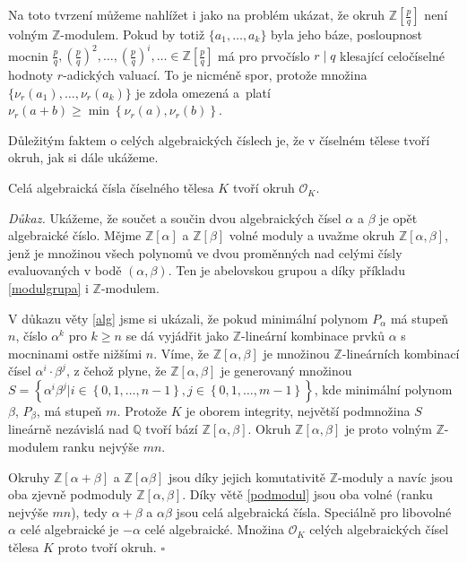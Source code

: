 \documentclass[12pt]{report}
\begin{document}
\begin{poznamka}
Na toto tvrzení můžeme nahlížet i jako na problém ukázat, že okruh $\mathbb{Z}\left[\frac{p}{q}\right]$ není volným $\mathbb{Z}$-modulem. Pokud by totiž $\lbrace a_1,\dots,a_k \rbrace$ byla jeho báze, posloupnost mocnin $\frac{p}{q}, \left(\frac{p}{q}\right)^2, \dots, \left(\frac{p}{q}\right)^i, \dots \in \mathbb{Z}\left[\frac{p}{q}\right]$ má pro prvočíslo $r \mid q$ klesající celočíselné hodnoty $r$-adických valuací. To je nicméně spor, protože množina $\lbrace \nu_r(a_1),\dots,\nu_r(a_k) \rbrace$ je zdola omezená a~platí $\nu_r(a+b) \geqslant \min\left\lbrace\nu_r(a),\nu_r(b)\right\rbrace$.
\end{poznamka}

Důležitým faktem o celých algebraických číslech je, že v číselném tělese tvoří okruh, jak si dále ukážeme.

\begin{veta}
Celá algebraická čísla číselného tělesa $K$ tvoří okruh $\mathcal{O}_K$.
\end{veta}
\noindent \textit{Důkaz.} Ukážeme, že součet a součin dvou algebraických čísel $\alpha$ a $\beta$ je opět algebraické číslo. Mějme $\mathbb{Z}[\alpha]$ a $\mathbb{Z}[\beta]$ volné moduly a uvažme okruh $\mathbb{Z}[\alpha,\beta]$, jenž je množinou všech polynomů ve dvou proměnných nad celými čísly evaluovaných v bodě $(\alpha,\beta)$. Ten je abelovskou grupou a díky příkladu \ref{modulgrupa} i $\mathbb{Z}$-modulem.

V důkazu věty \ref{alg} jsme si ukázali, že pokud minimální polynom $P_\alpha$ má stupeň $n$, číslo $\alpha^k$ pro $k \geqslant n$ se dá vyjádřit jako $\mathbb{Z}$-lineární kombinace prvků $\alpha$ s mocninami ostře nižšími $n$. Víme, že $\mathbb{Z}[\alpha,\beta]$ je množinou $\mathbb{Z}$-lineárních kombinací čísel $\alpha^i \cdot \beta^j$, z čehož plyne, že $\mathbb{Z}[\alpha,\beta]$ je generovaný množinou $S = \left\lbrace \alpha^i \beta^j \vert i \in \left\lbrace 0,1,\dots,n-1 \right\rbrace, j \in \left\lbrace 0,1,\dots,m-1 \right\rbrace \right\rbrace$, kde minimální polynom $\beta$, $P_\beta$, má stupeň $m$. Protože $K$ je oborem integrity, největší podmnožina $S$ lineárně nezávislá nad $\mathbb{Q}$ tvoří bází $\mathbb{Z}[\alpha,\beta]$. Okruh $\mathbb{Z}[\alpha,\beta]$ je proto volným $\mathbb{Z}$-modulem ranku nejvýše $mn$.

Okruhy $\mathbb{Z}[\alpha+\beta]$ a $\mathbb{Z}[\alpha \beta]$ jsou díky jejich komutativitě $\mathbb{Z}$-moduly a navíc jsou oba zjevně podmoduly $\mathbb{Z}[\alpha,\beta]$. Díky větě \ref{podmodul} jsou oba volné (ranku nejvýše $mn$), tedy $\alpha+\beta$ a $\alpha \beta$ jsou celá algebraická čísla. Speciálně pro libovolné $\alpha$ celé algebraické je $-\alpha$ celé algebraické. Množina $\mathcal{O}_K$ celých algebraických čísel tělesa $K$ proto tvoří okruh. \hfill $\square$\\
\end{document}
